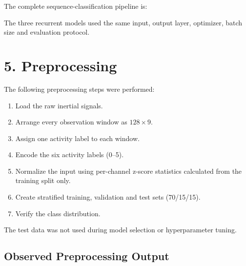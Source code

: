 \documentclass[10pt]{article}
\begin{document}
The complete sequence-classification pipeline is:

\begin{center}
\end{center}

The three recurrent models used the same input, output layer, optimizer,
batch size and evaluation protocol.

\section*{5. Preprocessing}

The following preprocessing steps were performed:

\begin{enumerate}
\item Load the raw inertial signals.
\item Arrange every observation window as $128\times9$.
\item Assign one activity label to each window.
\item Encode the six activity labels (0--5).
\item Normalize the input using per-channel z-score statistics calculated
from the training split only.
\item Create stratified training, validation and test sets (70/15/15).
\item Verify the class distribution.
\end{enumerate}

The test data was not used during model selection or hyperparameter tuning.

\subsection*{Observed Preprocessing Output}
\end{document}
